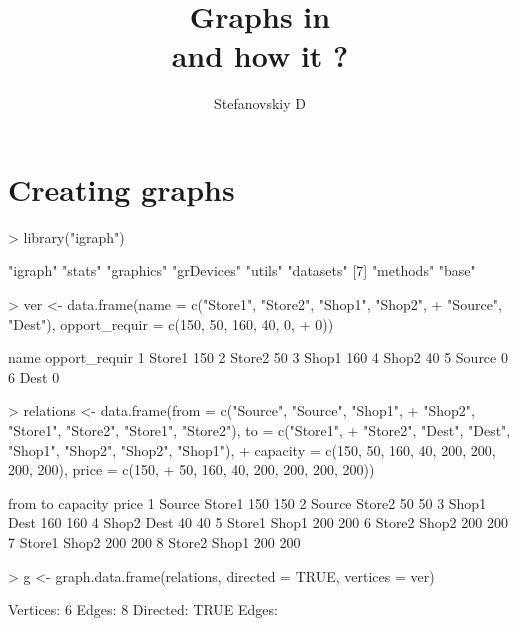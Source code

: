 \documentclass[a4paper,11pt]{scrartcl}
\title{Graphs  in  \R \\ and how it ?}
\author{ Stefanovskiy D }
\begin{document}
\maketitle



\section{Creating  graphs}
\label{sec:smallgraph}


\begin{Schunk}
\begin{Sinput}
> library("igraph")
\end{Sinput}
\begin{Soutput}
[1] "igraph"    "stats"     "graphics"  "grDevices" "utils"     "datasets" 
[7] "methods"   "base"     
\end{Soutput}
\begin{Sinput}
> ver <- data.frame(name = c("Store1", "Store2", "Shop1", "Shop2", 
+     "Source", "Dest"), opport_requir = c(150, 50, 160, 40, 0, 
+     0))
\end{Sinput}
\begin{Soutput}
    name opport_requir
1 Store1           150
2 Store2            50
3  Shop1           160
4  Shop2            40
5 Source             0
6   Dest             0
\end{Soutput}
\begin{Sinput}
> relations <- data.frame(from = c("Source", "Source", "Shop1", 
+     "Shop2", "Store1", "Store2", "Store1", "Store2"), to = c("Store1", 
+     "Store2", "Dest", "Dest", "Shop1", "Shop2", "Shop2", "Shop1"), 
+     capacity = c(150, 50, 160, 40, 200, 200, 200, 200), price = c(150, 
+         50, 160, 40, 200, 200, 200, 200))
\end{Sinput}
\begin{Soutput}
    from     to capacity price
1 Source Store1      150   150
2 Source Store2       50    50
3  Shop1   Dest      160   160
4  Shop2   Dest       40    40
5 Store1  Shop1      200   200
6 Store2  Shop2      200   200
7 Store1  Shop2      200   200
8 Store2  Shop1      200   200
\end{Soutput}
\begin{Sinput}
> g <- graph.data.frame(relations, directed = TRUE, vertices = ver)
\end{Sinput}
\begin{Soutput}
Vertices: 6 
Edges: 8 
Directed: TRUE 
Edges:
                        

\end{Soutput}
\end{Schunk}
\end{document}
